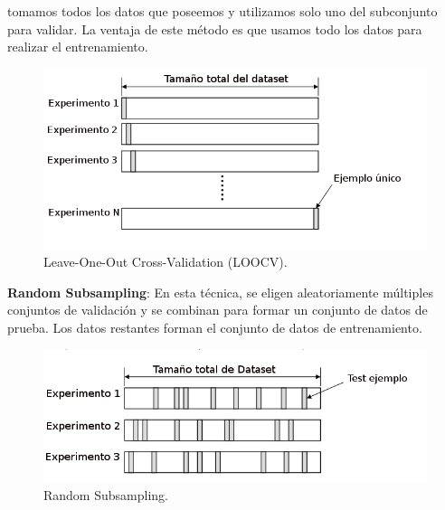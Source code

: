 tomamos todos los datos que poseemos y utilizamos solo uno del subconjunto para validar. La ventaja de este método es que usamos todo los datos para realizar el entrenamiento.

\begin{figure}[H]
 \centering
  \includegraphics[scale=0.4,keepaspectratio=true,clip=true]{imagenes/MarcoTeorico/cross-validation-LOOCV.png}
  \caption{Leave-One-Out Cross-Validation (LOOCV).}%
	\label{Fig: crossvalidation-LOOCV}
\end{figure}

\par \textbf{Random Subsampling}: En esta técnica, se eligen aleatoriamente múltiples conjuntos de validación y se combinan para formar un conjunto de datos de prueba. Los datos restantes forman el conjunto de datos de entrenamiento.

\begin{figure}[H]
 \centering
  \includegraphics[scale=0.5,keepaspectratio=true,clip=true]{imagenes/MarcoTeorico/cross-validation-random.png}
  \caption{Random Subsampling.}%
	\label{Fig: random-Subsampling}
\end{figure}





